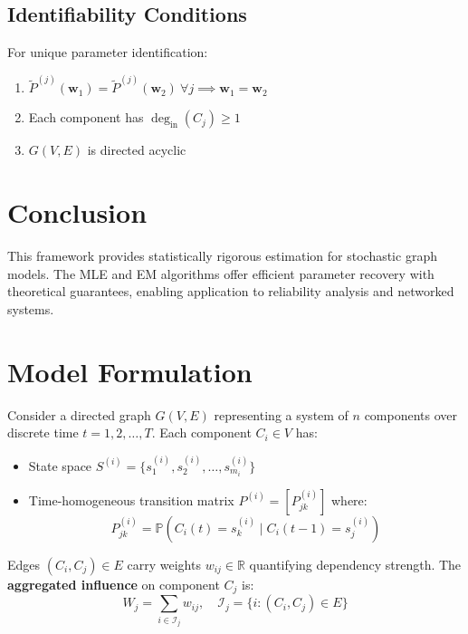\documentclass[answers,12pt,addpoints]{exam}
\begin{document}
\subsection{Identifiability Conditions}
For unique parameter identification:
\begin{enumerate}
    \item $\widetilde{P}^{(j)}(\mathbf{w}_1) = \widetilde{P}^{(j)}(\mathbf{w}_2) \: \forall j \implies \mathbf{w}_1 = \mathbf{w}_2$
    \item Each component has $\deg_{\text{in}}(C_j) \geq 1$
    \item $G(V,E)$ is directed acyclic
\end{enumerate}

\section{Conclusion}
This framework provides statistically rigorous estimation for stochastic graph models. The MLE and EM algorithms offer efficient parameter recovery with theoretical guarantees, enabling application to reliability analysis and networked systems.


\newpage

\section{Model Formulation}
Consider a directed graph $G(V,E)$ representing a system of $n$ components over discrete time $t = 1, 2, \dots, T$. Each component $C_i \in V$ has:

\begin{itemize}
    \item State space $S^{(i)} = \{s^{(i)}_1, s^{(i)}_2, \dots, s^{(i)}_{m_i}\}$
    \item Time-homogeneous transition matrix $P^{(i)} = [P^{(i)}_{jk}]$ where:
    \begin{equation}
        P^{(i)}_{jk} = \mathbb{P}(C_i(t) = s^{(i)}_k \mid C_i(t-1) = s^{(i)}_j)
    \end{equation}
\end{itemize}

Edges $(C_i, C_j) \in E$ carry weights $w_{ij} \in \mathbb{R}$ quantifying dependency strength. The \textbf{aggregated influence} on component $C_j$ is:
\begin{equation}
    W_j = \sum_{i \in \mathscr{I}_j} w_{ij}, \quad \mathscr{I}_j = \{i : (C_i, C_j) \in E\}
\end{equation}
\end{document}
